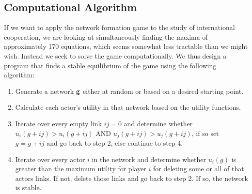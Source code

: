 \documentclass[12pt,onesided,fullpage]{amsart}
\begin{document}
\subsection{Computational Algorithm}
If we want to apply the network formation game to the study of international cooperation, we are looking at simultaneously finding the maxima of approximately 170 equations, which seems somewhat less tractable than we might wish. Instead we seek to solve the game computationally. We thus design a program that finds a stable equilibrium of the game using the following algorithm:
\begin{enumerate}
\item Generate a network $\bf{g}$ either at random or based on a desired starting point. 
\item Calculate each actor's utility in that network based on the utility functions.
\item Iterate over every empty link $ij = 0$ and determine whether \\ $u_{i}(g+ij) > u_{i}(g+ij)  \text{ AND } u_{j}(g+ij) > u_{j}(g+ij)$, if so set $g = g + ij$ and go back to step 2, else continue to step 4.
\item Iterate over every actor $i$ in the network and determine whether $u_{i}(g)$ is greater than the maximum utility for player $i$ for deleting some or all of that actors links. If not, delete those links and go back to step 2. If so, the network is stable.
\end{enumerate}
\end{document}
